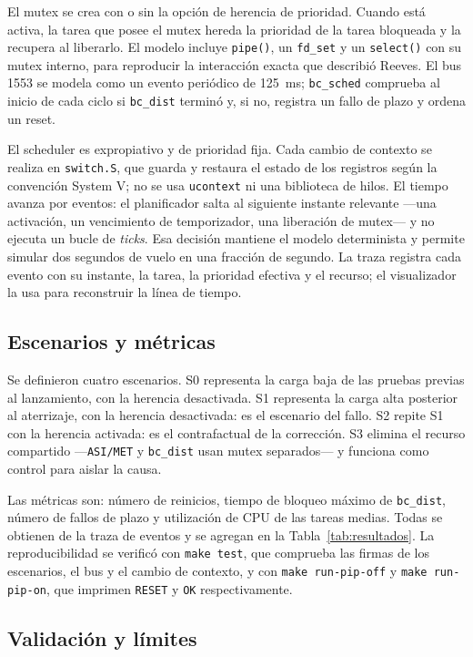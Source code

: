 \documentclass[journal]{IEEEtran}
\begin{document}
El mutex se crea con o sin la opción de herencia de prioridad. Cuando está activa, la tarea que posee el mutex hereda la prioridad de la tarea bloqueada y la recupera al liberarlo. El modelo incluye \texttt{pipe()}, un \texttt{fd\_set} y un \texttt{select()} con su mutex interno, para reproducir la interacción exacta que describió Reeves. El bus 1553 se modela como un evento periódico de 125~ms; \texttt{bc\_sched} comprueba al inicio de cada ciclo si \texttt{bc\_dist} terminó y, si no, registra un fallo de plazo y ordena un reset.

El scheduler es expropiativo y de prioridad fija. Cada cambio de contexto se realiza en \texttt{switch.S}, que guarda y restaura el estado de los registros según la convención System V; no se usa \texttt{ucontext} ni una biblioteca de hilos. El tiempo avanza por eventos: el planificador salta al siguiente instante relevante ---una activación, un vencimiento de temporizador, una liberación de mutex--- y no ejecuta un bucle de \emph{ticks}. Esa decisión mantiene el modelo determinista y permite simular dos segundos de vuelo en una fracción de segundo. La traza registra cada evento con su instante, la tarea, la prioridad efectiva y el recurso; el visualizador la usa para reconstruir la línea de tiempo.

\subsection{Escenarios y métricas}

Se definieron cuatro escenarios. S0 representa la carga baja de las pruebas previas al lanzamiento, con la herencia desactivada. S1 representa la carga alta posterior al aterrizaje, con la herencia desactivada: es el escenario del fallo. S2 repite S1 con la herencia activada: es el contrafactual de la corrección. S3 elimina el recurso compartido ---\texttt{ASI/MET} y \texttt{bc\_dist} usan mutex separados--- y funciona como control para aislar la causa.

Las métricas son: número de reinicios, tiempo de bloqueo máximo de \texttt{bc\_dist}, número de fallos de plazo y utilización de CPU de las tareas medias. Todas se obtienen de la traza de eventos y se agregan en la Tabla~\ref{tab:resultados}. La reproducibilidad se verificó con \texttt{make test}, que comprueba las firmas de los escenarios, el bus y el cambio de contexto, y con \texttt{make run-pip-off} y \texttt{make run-pip-on}, que imprimen \texttt{RESET} y \texttt{OK} respectivamente.

\subsection{Validación y límites}
\end{document}
